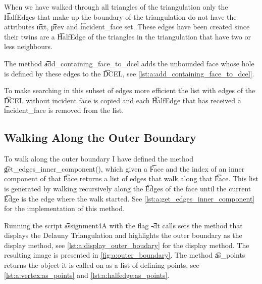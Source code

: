 	When we have walked through all triangles of the triangulation only the \t{HalfEdge}s that make up the boundary of the triangulation do not have the attributes \t{nxt}, \t{prev} and \t{incident_face} set. These edges have been created since their twins are a \t{HalfEdge} of the triangles in the triangulation that have two or less neighbours.

	The method \t{add_containing_face_to_dcel} adds the unbounded face whose hole is defined by these edges to the \t{DCEL}, see \autoref{lst:a:add_containing_face_to_dcel}. 

	

	To make searching in this subset of edges more efficient the list with edges of the \t{DCEL} without incident face is copied and each \t{HalfEdge} that has received a \t{incident_face} is removed from the list. \\

\subsection{Walking Along the Outer Boundary}
To walk along the outer boundary I have defined the method \t{get_edges_inner_component()}, which given a \t{Face} and the index of an inner component of that \t{Face} returns a list of edges that walk along that \t{Face}. This list is generated by walking recursively along the \t{Edge}s of the face until the current \t{Edge} is the edge where the walk started. See \autoref{lst:a:get_edges_inner_component} for the implementation of this method.



Running the script \t{assignment4A} with the flag \t{-dt} calls sets the method that displays the Delauny Triangulation and highlights the outer boundary as the display method, see \autoref{lst:a:display_outer_boudary} for the display method. The resulting image is presented in \autoref{fig:a:outer_boundary}. The method \t{as_points} returns the object it is called on as a list of defining points, see \autoref{lst:a:vertex:as_points} and \autoref{lst:a:halfedge:as_points}.



